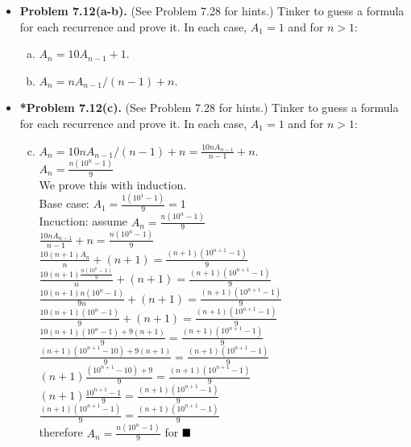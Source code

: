 \documentclass[11pt]{article}
\begin{document}
\begin{itemize}
\vspace{0.1in}

\item \textbf{Problem 7.12(a-b).} (See Problem 7.28 for hints.)
Tinker to guess a formula for each recurrence and prove it.
In each case, $A_1=1$ and for $n>1$:
\begin{enumerate}[(a)]
\item $A_n=10A_{n-1}+1$.
\item $A_n=nA_{n-1}/(n-1)+n$.
\end{enumerate}

\vspace{0.1in}

\item \textbf{*Problem 7.12(c).} (See Problem 7.28 for hints.)
Tinker to guess a formula for each recurrence and prove it.
In each case, $A_1=1$ and for $n>1$:
\begin{enumerate}[(a)]
\setcounter{enumi}{2}
\item $A_n=10nA_{n-1}/(n-1)+n=\frac{10nA_{n-1}}{n-1}+n$.
\\$A_n=\frac{n(10^n-1)}{9}$
\\We prove this with induction.
\\Base case: $A_1=\frac{1(10^1-1)}{9}=1$
\\Incuction: assume $A_n=\frac{n(10^n-1)}{9}$
\\$\frac{10nA_{n-1}}{n-1}+n=\frac{n(10^n-1)}{9}$
\\$\frac{10(n+1)A_{n}}{n}+(n+1)=\frac{(n+1)(10^{n+1}-1)}{9}$
\\$\frac{10(n+1)\frac{n(10^n-1)}{9}}{n}+(n+1)=\frac{(n+1)(10^{n+1}-1)}{9}$
\\$\frac{10(n+1)n(10^n-1)}{9n}+(n+1)=\frac{(n+1)(10^{n+1}-1)}{9}$
\\$\frac{10(n+1)(10^n-1)}{9}+(n+1)=\frac{(n+1)(10^{n+1}-1)}{9}$
\\$\frac{10(n+1)(10^n-1)+9(n+1)}{9}=\frac{(n+1)(10^{n+1}-1)}{9}$
\\$\frac{(n+1)(10^{n+1}-10)+9(n+1)}{9}=\frac{(n+1)(10^{n+1}-1)}{9}$
\\$(n+1)\frac{(10^{n+1}-10)+9}{9}=\frac{(n+1)(10^{n+1}-1)}{9}$
\\$(n+1)\frac{10^{n+1}-1}{9}=\frac{(n+1)(10^{n+1}-1)}{9}$
\\$\frac{(n+1)(10^{n+1}-1)}{9}=\frac{(n+1)(10^{n+1}-1)}{9}$
\\therefore $A_n=\frac{n(10^n-1)}{9}$ for $\hfill\blacksquare$

\end{enumerate}


\end{itemize}
\end{document}
